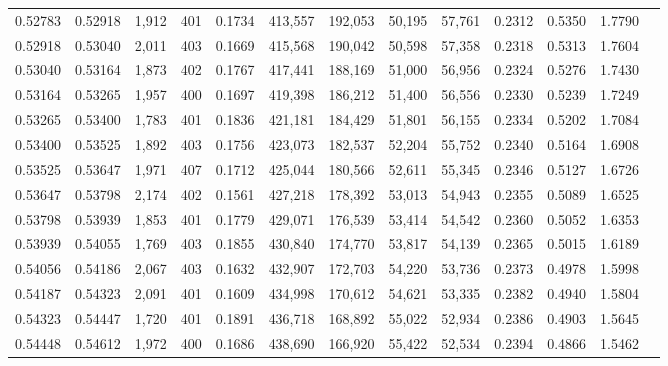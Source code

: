 \begin{tabular}{rrrrrrrrrrrrr}
0.52783 & 0.52918 & 1,912 & 401 &                                     0.1734 & 413,557 & 192,053 &  50,195 &  57,761 & 0.2312 & 0.5350 & 1.7790 \\
0.52918 & 0.53040 & 2,011 & 403 &                                     0.1669 & 415,568 & 190,042 &  50,598 &  57,358 & 0.2318 & 0.5313 & 1.7604 \\
0.53040 & 0.53164 & 1,873 & 402 &                                     0.1767 & 417,441 & 188,169 &  51,000 &  56,956 & 0.2324 & 0.5276 & 1.7430 \\
0.53164 & 0.53265 & 1,957 & 400 &                                     0.1697 & 419,398 & 186,212 &  51,400 &  56,556 & 0.2330 & 0.5239 & 1.7249 \\
0.53265 & 0.53400 & 1,783 & 401 &                                     0.1836 & 421,181 & 184,429 &  51,801 &  56,155 & 0.2334 & 0.5202 & 1.7084 \\
0.53400 & 0.53525 & 1,892 & 403 &                                     0.1756 & 423,073 & 182,537 &  52,204 &  55,752 & 0.2340 & 0.5164 & 1.6908 \\
0.53525 & 0.53647 & 1,971 & 407 &                                     0.1712 & 425,044 & 180,566 &  52,611 &  55,345 & 0.2346 & 0.5127 & 1.6726 \\
0.53647 & 0.53798 & 2,174 & 402 &                                     0.1561 & 427,218 & 178,392 &  53,013 &  54,943 & 0.2355 & 0.5089 & 1.6525 \\
0.53798 & 0.53939 & 1,853 & 401 &                                     0.1779 & 429,071 & 176,539 &  53,414 &  54,542 & 0.2360 & 0.5052 & 1.6353 \\
0.53939 & 0.54055 & 1,769 & 403 &                                     0.1855 & 430,840 & 174,770 &  53,817 &  54,139 & 0.2365 & 0.5015 & 1.6189 \\
0.54056 & 0.54186 & 2,067 & 403 &                                     0.1632 & 432,907 & 172,703 &  54,220 &  53,736 & 0.2373 & 0.4978 & 1.5998 \\
0.54187 & 0.54323 & 2,091 & 401 &                                     0.1609 & 434,998 & 170,612 &  54,621 &  53,335 & 0.2382 & 0.4940 & 1.5804 \\
0.54323 & 0.54447 & 1,720 & 401 &                                     0.1891 & 436,718 & 168,892 &  55,022 &  52,934 & 0.2386 & 0.4903 & 1.5645 \\
0.54448 & 0.54612 & 1,972 & 400 &                                     0.1686 & 438,690 & 166,920 &  55,422 &  52,534 & 0.2394 & 0.4866 & 1.5462 \\

\end{tabular}

